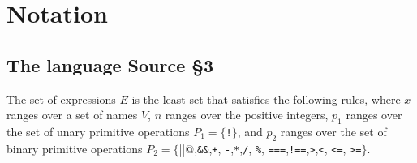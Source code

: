 

\newcommand{\Rule}[2]{\genfrac{}{}{0.7pt}{}{{\setlength{\fboxrule}{0pt}\setlength{\fboxsep}{3mm}\fbox{$#1$}}}{{\setlength{\fboxrule}{0pt}\setlength{\fboxsep}{3mm}\fbox{$#2$}}}}

\newcommand{\TruE}{\textbf{\texttt{true}}}
\newcommand{\FalsE}{\textbf{\texttt{false}}}
\newcommand{\AndOp}{\texttt{\&\&}}
\newcommand{\OrOp}{\texttt{||}}
\newcommand{\ThenOp}{\texttt{?}}
\newcommand{\ElseOp}{\texttt{:}}
\newcommand{\Rc}{\texttt{\}}}
\newcommand{\Lc}{\texttt{\{}}
\newcommand{\Rp}{\texttt{)}}
\newcommand{\Lp}{\texttt{(}}
\newcommand{\Fun}{\textbf{\texttt{function}}}
\newcommand{\Let}{\textbf{\texttt{let}}}
\newcommand{\Return}{\textbf{\texttt{return}}}
\newcommand{\Const}{\textbf{\texttt{const}}}
\newcommand{\If}{\textbf{\texttt{if}}}
\newcommand{\Else}{\textbf{\texttt{else}}}
\newcommand{\Bool}{\texttt{bool}}
\newcommand{\Number}{\texttt{number}}
\newcommand{\String}{\texttt{string}}
\newcommand{\Undefined}{\texttt{undefined}}
\newcommand{\List}{\textit{List}}
\newcommand{\Array}{\textit{Array}}
\newcommand{\Pair}{\textit{Pair}}
\newcommand{\Pred}{\textit{Pred}}
\newcommand{\head}{\textit{head}}
\newcommand{\tail}{\textit{tail}}
\newcommand{\type}{\textit{type}}
\newcommand{\polytype}{\textit{polytype}}
\newcommand{\predtype}{\textit{predtype}}
\newcommand{\ExtractPos}{\ensuremath{\textit{Extract}^+}}
\newcommand{\ExtractNeg}{\ensuremath{\textit{Extract}^-}}

\newtheorem{definition}{Definition}[section]




\section{Notation}  

\subsection{The language Source \S3}

The set of expressions $E$ is the least set that satisfies the following rules, 
where $x$ ranges over a set of names $V$, $n$ ranges over the positive integers, 
$p_1$ ranges over the set of unary primitive operations 
$P_1 = \{$\verb#!#$\}$, and $p_2$ ranges over the set of binary 
primitive operations
$P_2 = \{$\verb@||@,\verb#&&#,\verb#+#,
\verb#-#,\verb#*#,\verb#/#, \verb#%#, \verb#===#,\verb#!==#,\verb#>#,\verb#<#, \verb#<=#, \verb#>=#$\}$.


